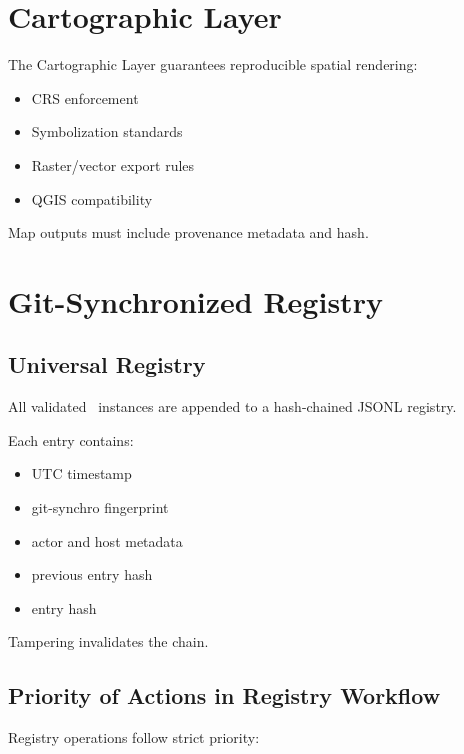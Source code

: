 
\section{Cartographic Layer}
\label{ch:carto-layer}

The Cartographic Layer guarantees reproducible spatial rendering:

\begin{itemize}
\item CRS enforcement
\item Symbolization standards
\item Raster/vector export rules
\item QGIS compatibility
\end{itemize}

Map outputs must include provenance metadata and hash.


\section{Git-Synchronized Registry}
\label{ch:registry}

\subsection{Universal Registry}

All validated \hydrot\ instances are appended to a hash-chained JSONL registry.

Each entry contains:

\begin{itemize}
\item UTC timestamp
\item git-synchro fingerprint
\item actor and host metadata
\item previous entry hash
\item entry hash
\end{itemize}

Tampering invalidates the chain.

\subsection{Priority of Actions in Registry Workflow}

Registry operations follow strict priority:

